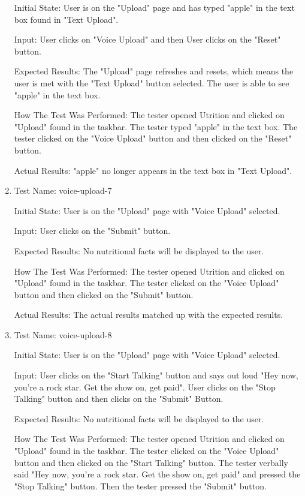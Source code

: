 \documentclass[12pt, titlepage]{article}
\begin{document}
\begin{enumerate}
		Initial State: User is on the "Upload" page and has typed "apple" in the text box found in "Text Upload".
		
		Input: User clicks on "Voice Upload" and then User clicks on the "Reset" button.
		
		Expected Results: The "Upload" page refreshes and resets, which means the user is met with the "Text Upload" button selected. The user is able to see "apple" in the text box.
		
		How The Test Was Performed: The tester opened Utrition and clicked on "Upload" found in the taskbar. The tester typed "apple" in the text box. The tester clicked on the "Voice Upload" button and then clicked on the "Reset" button.
		
		Actual Results: "apple" no longer appears in the text box in "Text Upload".
		
		\item{Test Name: voice-upload-7}
		
		Initial State: User is on the "Upload" page with "Voice Upload" selected.
		
		Input: User clicks on the "Submit" button.
		
		Expected Results: No nutritional facts will be displayed to the user.
		
		How The Test Was Performed: The tester opened Utrition and clicked on "Upload" found in the taskbar. The tester clicked on the "Voice Upload" button and then clicked on the "Submit" button.
		
		Actual Results: The actual results matched up with the expected results.
		
		\item{Test Name: voice-upload-8}
		
		Initial State: User is on the "Upload" page with "Voice Upload" selected.
		
		Input: User clicks on the "Start Talking" button and says out loud "Hey now, you're a rock star. Get the show on, get paid". User clicks on the "Stop Talking" button and then clicks on the "Submit" Button.
		
		Expected Results: No nutritional facts will be displayed to the user.
		
		How The Test Was Performed: The tester opened Utrition and clicked on "Upload" found in the taskbar. The tester clicked on the "Voice Upload" button and then clicked on the "Start Talking" button. The tester verbally said "Hey now, you're a rock star. Get the show on, get paid" and pressed the "Stop Talking" button. Then the tester pressed the "Submit" button.
		

\end{enumerate}
\end{document}
